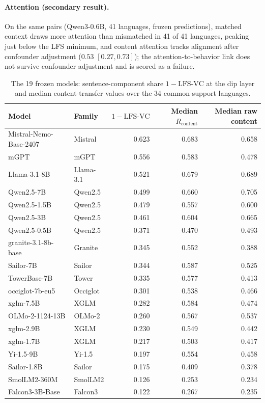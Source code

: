 \documentclass{article} %
\begin{document}
\paragraph{Attention (secondary result).} On the same pairs (Qwen3-0.6B, 41 languages, frozen predictions), matched context draws more attention than mismatched in 41 of 41 languages, peaking just below the LFS minimum, and content attention tracks alignment after confounder adjustment ($0.53$ $[0.27, 0.73]$); the attention-to-behavior link does not survive confounder adjustment and is scored as a failure.
\begin{table}[h]\caption{The 19 frozen models: sentence-component share $1-\mathrm{LFS\text{-}VC}$ at the dip layer and median content-transfer values over the 34 common-support languages.}\label{tab:r1_models}
\begin{center}\small
\begin{tabular}{llrrr}
\toprule
Model & Family & $1-\mathrm{LFS\mbox{-}VC}$ & Median $R_{\mathrm{content}}$ & Median raw content \\
\midrule
Mistral-Nemo-Base-2407 & Mistral & 0.623 & 0.683 & 0.658 \\
mGPT & mGPT & 0.556 & 0.583 & 0.478 \\
Llama-3.1-8B & Llama-3.1 & 0.521 & 0.679 & 0.689 \\
Qwen2.5-7B & Qwen2.5 & 0.499 & 0.660 & 0.705 \\
Qwen2.5-1.5B & Qwen2.5 & 0.479 & 0.557 & 0.600 \\
Qwen2.5-3B & Qwen2.5 & 0.461 & 0.604 & 0.665 \\
Qwen2.5-0.5B & Qwen2.5 & 0.371 & 0.470 & 0.493 \\
granite-3.1-8b-base & Granite & 0.345 & 0.552 & 0.388 \\
Sailor-7B & Sailor & 0.344 & 0.587 & 0.525 \\
TowerBase-7B & Tower & 0.335 & 0.577 & 0.413 \\
occiglot-7b-eu5 & Occiglot & 0.301 & 0.538 & 0.466 \\
xglm-7.5B & XGLM & 0.282 & 0.584 & 0.474 \\
OLMo-2-1124-13B & OLMo-2 & 0.260 & 0.567 & 0.537 \\
xglm-2.9B & XGLM & 0.230 & 0.549 & 0.442 \\
xglm-1.7B & XGLM & 0.217 & 0.503 & 0.417 \\
Yi-1.5-9B & Yi-1.5 & 0.197 & 0.554 & 0.458 \\
Sailor-1.8B & Sailor & 0.175 & 0.409 & 0.378 \\
SmolLM2-360M & SmolLM2 & 0.126 & 0.253 & 0.234 \\
Falcon3-3B-Base & Falcon3 & 0.122 & 0.267 & 0.235 \\
\bottomrule
\end{tabular}
\end{center}

\end{table}
\end{document}
